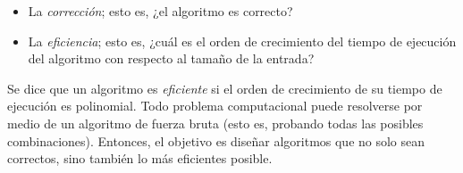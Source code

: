 \begin{itemize}
  \item La \emph{corrección}; esto es, ¿el algoritmo es correcto?
  \item La \emph{eficiencia}; esto es, ¿cuál es el orden de crecimiento del 
  tiempo de ejecución del algoritmo con respecto al tamaño de la entrada?
\end{itemize}
Se dice que un algoritmo es \emph{eficiente} si el orden de crecimiento
de su tiempo de ejecución es polinomial. 
Todo problema computacional puede resolverse por medio de un algoritmo de fuerza bruta (esto es, probando todas las posibles combinaciones).
Entonces, el objetivo es diseñar algoritmos que no solo sean correctos, sino también lo más eficientes posible.


